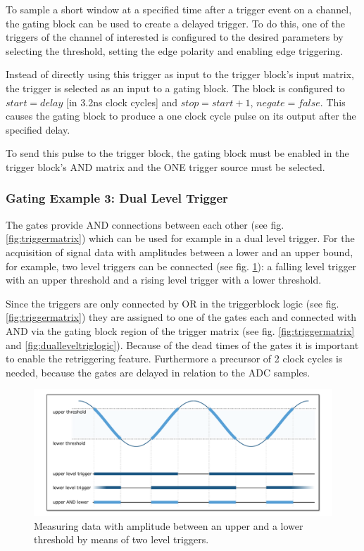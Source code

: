 			To sample a short window at a specified time after a trigger event on a channel, the gating block can be used to create a delayed trigger. To do this, one of the triggers of the channel of interested is configured to the desired parameters by selecting the threshold, setting the edge polarity and 
enabling edge triggering.\par

			Instead of directly using this trigger as input to the trigger block's input matrix, the trigger is selected as an input to a gating block. The block is configured to $start = delay$ [in 3.2ns clock cycles] 
and $stop = start+1$, $negate = false$. This causes the gating block to produce a one clock cycle pulse on its output after the specified delay.\par

			To send this pulse to the trigger block, the gating block must be enabled in the trigger block's AND matrix and the ONE trigger source must be selected. 
			
		\subsubsection{Gating Example 3: Dual Level Trigger}
		
			The gates provide AND connections between each other (see fig. \ref{fig:triggermatrix}) which can be used for example in a dual level trigger. For the acquisition of signal data with amplitudes between a lower and an upper bound, for example, two level triggers can be connected (see fig. \ref{fig:dualleveltrig}): a falling level trigger with an upper threshold and a rising level trigger with a lower threshold.\par
			Since the triggers are only connected by OR in the triggerblock logic (see fig. \ref{fig:triggermatrix}) they are assigned to one of the gates each and connected with AND via the gating block region of the trigger matrix (see fig. \ref{fig:triggermatrix} and \ref{fig:dualleveltriglogic}). Because of the dead times of the gates it is important to enable the retriggering feature. Furthermore a precursor of 2 clock cycles is needed, because the gates are delayed in relation to the ADC samples.\par
			\begin{figure}[h]
				\begin{center}
					\includegraphics[width=\textwidth]{figures/dual_level_triggering.pdf}
					\caption{\label{fig:dualleveltrig}Measuring data with amplitude between an upper and a lower threshold by means of two level triggers.}
				\end{center}
			\end{figure}	
			
